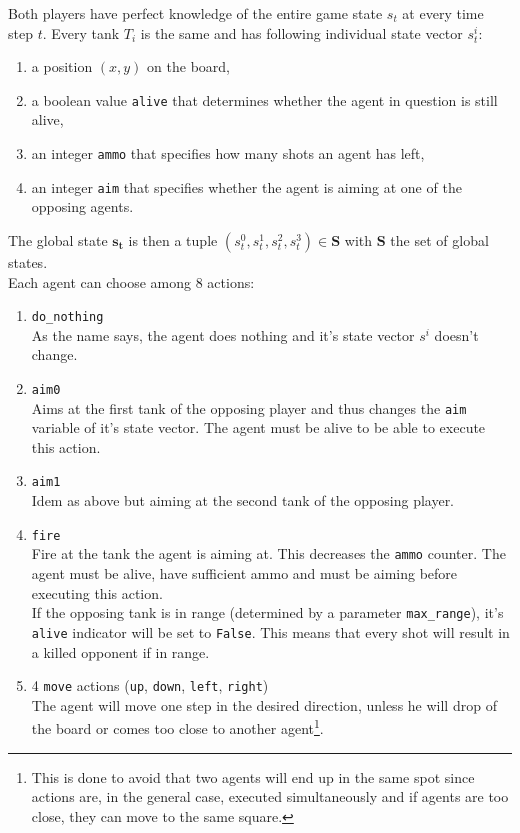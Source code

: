 Both players have perfect knowledge of the entire game state $s_t$ at every time step $t$.
Every tank $T_i$ is the same and has following individual state vector $s^i_t$:
\begin{enumerate}
    \item a position $(x,y)$ on the board,
    \item a boolean value {\tt alive} that determines whether the agent in question is still alive,
    \item an integer {\tt ammo} that specifies how many shots an agent has left,
    \item an integer {\tt aim} that specifies whether the agent is aiming at one of the opposing agents.
\end{enumerate}
The global state $\bm{s_t}$ is then a tuple $(s_t^0, s_t^1, s_t^2, s_t^3) \in \bm{S}$ with $\bm{S}$ the set of global states.\\
Each agent can choose among $8$ actions:
\begin{enumerate}
    \item {\tt do\_nothing}\\
        As the name says, the agent does nothing and it's state vector $s^i$ doesn't change.
    \item {\tt aim0} \\
        Aims at the first tank of the opposing player and thus changes the {\tt aim} variable of it's state vector. The agent must be alive to be able to execute this action.
    \item {\tt aim1} \\
        Idem as above but aiming at the second tank of the opposing player.
    \item {\tt fire} \\
        Fire at the tank the agent is aiming at. This decreases the {\tt ammo} counter. The agent must be alive, have sufficient ammo and must be aiming before executing this action.\\
        If the opposing tank is in range (determined by a parameter {\tt max\_range}), it's {\tt alive} indicator will be set to {\tt False}. This means that every shot will result in a killed opponent if in range.
    \item 4 {\tt move} actions ({\tt up}, {\tt down}, {\tt left}, {\tt right})\\
        The agent will move one step in the desired direction, unless he will drop of the board or comes too close to another agent\footnote{This is done to avoid that two agents will end up in the same spot since actions are, in the general case, executed simultaneously and if agents are too close, they can move to the same square.}.
\end{enumerate}

